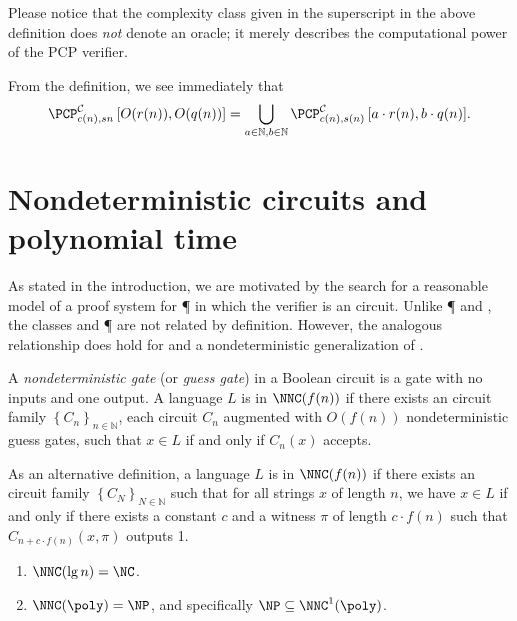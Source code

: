 \documentclass[]{article}
\newcommand{\PCPcs}[5]{\PCP^{#1}_{#2, #3}\left[#4, #5\right]}
\begin{document}
Please notice that the complexity class given in the superscript in the above definition does \emph{not} denote an oracle; it merely describes the computational power of the PCP verifier.

From the definition, we see immediately that
\begin{equation*}
  \PCPcs{\mathcal{C}}{c(n)}{s{n}}{O(r(n))}{O(q(n))} = \bigcup_{a \in \mathbb{N}, b \in \mathbb{N}}{\PCPcs{\mathcal{C}}{c(n)}{s(n)}{a \cdot r(n)}{b \cdot q(n)}}.
\end{equation*}

\section{Nondeterministic \texorpdfstring{\NC}{NC} circuits and polynomial time}\label{sec:nnc}

As stated in the introduction, we are motivated by the search for a reasonable model of a proof system for \P{} in which the verifier is an \NC{} circuit.
Unlike \P{} and \NP{}, the classes \NC{} and \P{} are not related by definition.
However, the analogous relationship does hold for \NC{} and a nondeterministic generalization of \NC{}.
\begin{definition}
  A \emph{nondeterministic gate} (or \emph{guess gate}) in a Boolean circuit is a gate with no inputs and one output.
  A language $L$ is in $\NNC(f(n))$ if there exists an \NC{} circuit family $\left\{C_n\right\}_{n \in \mathbb{N}}$, each circuit $C_n$ augmented with $O(f(n))$ nondeterministic guess gates, such that $x \in L$ if and only if $C_n(x)$ accepts.

  As an alternative definition, a language $L$ is in $\NNC(f(n))$ if there exists an \NC{} circuit family $\left\{C_N\right\}_{N \in \mathbb{N}}$ such that for all strings $x$ of length $n$, we have $x \in L$ if and only if there exists a constant $c$ and a witness $\pi$ of length $c \cdot f(n)$ such that $C_{n + c \cdot f(n)}(x, \pi)$ outputs 1.
\end{definition}

\begin{proposition}\label{prop:nnc}
  \mbox{}
  \begin{enumerate}
  \item $\NNC(\lg n) = \NC$.
  \item $\NNC(\poly) = \NP$, and specifically $\NP \subseteq \NNC^1(\poly)$.
  \end{enumerate}
\end{proposition}
\end{document}
